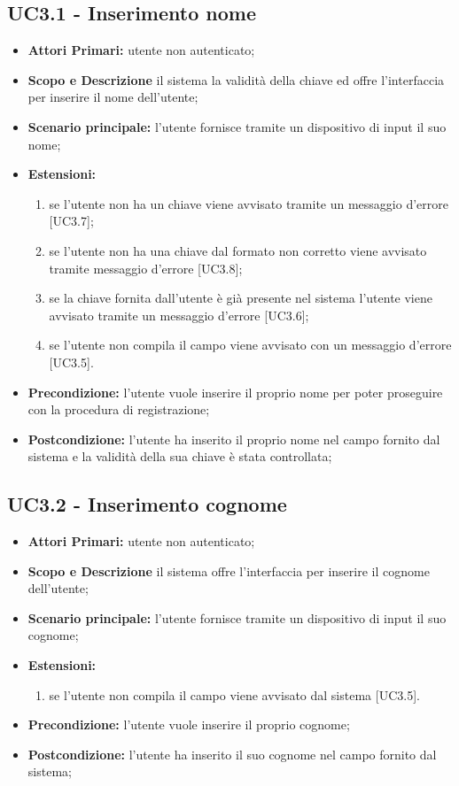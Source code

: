 \documentclass[AnalisiDeiRequisiti.tex]{subfiles}
\begin{document}
\subsection{UC3.1 - Inserimento nome}
\begin{itemize}
	\item \textbf{Attori Primari:} utente non autenticato;
	\item \textbf{Scopo e Descrizione} il sistema  la validità della chiave ed offre l'interfaccia per inserire il nome dell'utente;
	\item \textbf{Scenario principale:} l'utente fornisce tramite un dispositivo di input il suo nome;
	\item \textbf{Estensioni:}
		\begin{enumerate}
			\item se l'utente non ha un chiave viene avvisato tramite un messaggio d'errore [UC3.7];
			\item se l'utente non ha una chiave dal formato non corretto viene avvisato tramite messaggio d'errore [UC3.8];
			\item se la chiave fornita dall'utente è già presente nel sistema l'utente viene avvisato tramite un messaggio d'errore [UC3.6];
			\item se l'utente non compila il campo viene avvisato con un messaggio d'errore [UC3.5].
		\end{enumerate}
	\item \textbf{Precondizione:} l'utente vuole inserire il proprio nome per poter proseguire con la procedura di registrazione;
	\item \textbf{Postcondizione:} l'utente ha inserito il proprio nome nel campo fornito dal sistema e la validità della sua chiave è stata controllata;
\end{itemize}	
\subsection{UC3.2 - Inserimento cognome}
\begin{itemize}
	\item \textbf{Attori Primari:} utente non autenticato;
	\item \textbf{Scopo e Descrizione} il sistema offre l'interfaccia per inserire il cognome dell'utente;
	\item \textbf{Scenario principale:} l'utente fornisce tramite un dispositivo di input il suo cognome;
	\item \textbf{Estensioni:}
		\begin{enumerate}
				\item se l'utente non compila il campo viene avvisato dal sistema [UC3.5].
		\end{enumerate}		
	\item \textbf{Precondizione:} l'utente vuole inserire il proprio cognome;
	\item \textbf{Postcondizione:} l'utente ha inserito il suo cognome nel campo fornito dal sistema;
\end{itemize}
\end{document}

